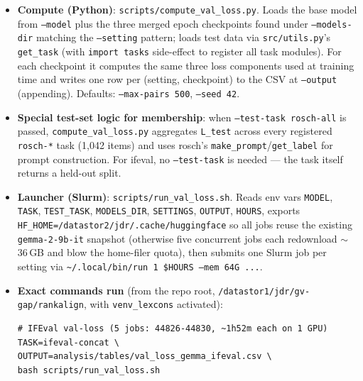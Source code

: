 \documentclass[11pt,a4paper]{article}
\begin{document}
\begin{itemize}
\item \textbf{Compute (Python)}: \texttt{scripts/compute\_val\_loss.py}. Loads the base model from \texttt{--model} plus the three merged epoch checkpoints found under \texttt{--models-dir} matching the \texttt{--setting} pattern; loads test data via \texttt{src/utils.py}'s \texttt{get\_task} (with \texttt{import tasks} side-effect to register all task modules). For each checkpoint it computes the same three loss components used at training time and writes one row per (setting, checkpoint) to the CSV at \texttt{--output} (appending). Defaults: \texttt{--max-pairs 500}, \texttt{--seed 42}.
\item \textbf{Special test-set logic for membership}: when \texttt{--test-task rosch-all} is passed, \texttt{compute\_val\_loss.py} aggregates \texttt{L\_test} across every registered \texttt{rosch-*} task (1{,}042 items) and uses rosch's \texttt{make\_prompt}/\texttt{get\_label} for prompt construction. For ifeval, no \texttt{--test-task} is needed --- the task itself returns a held-out split.
\item \textbf{Launcher (Slurm)}: \texttt{scripts/run\_val\_loss.sh}. Reads env vars \texttt{MODEL}, \texttt{TASK}, \texttt{TEST\_TASK}, \texttt{MODELS\_DIR}, \texttt{SETTINGS}, \texttt{OUTPUT}, \texttt{HOURS}, exports \texttt{HF\_HOME=/datastor2/jdr/.cache/huggingface} so all jobs reuse the existing \texttt{gemma-2-9b-it} snapshot (otherwise five concurrent jobs each redownload $\sim$36\,GB and blow the home-filer quota), then submits one Slurm job per setting via \texttt{\textasciitilde/.local/bin/run 1 \$HOURS --mem 64G ...}.
\item \textbf{Exact commands run} (from the repo root, \texttt{/datastor1/jdr/gv-gap/rankalign}, with \texttt{venv\_lexcons} activated):
\begin{verbatim}
# IFEval val-loss (5 jobs: 44826-44830, ~1h52m each on 1 GPU)
TASK=ifeval-concat \
OUTPUT=analysis/tables/val_loss_gemma_ifeval.csv \
bash scripts/run_val_loss.sh


\end{verbatim}
\end{itemize}
\end{document}
